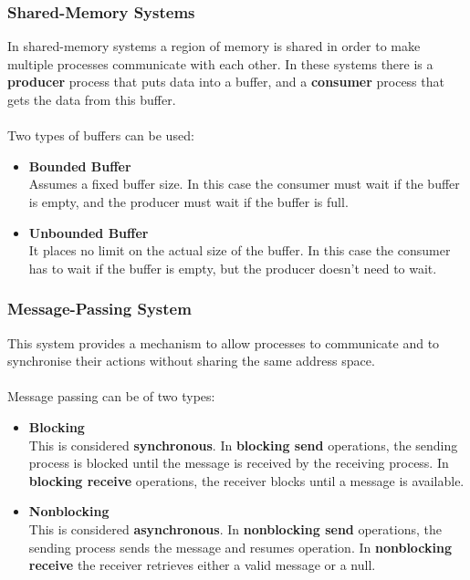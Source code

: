 \documentclass{article}
\begin{document}
\subsubsection{Shared-Memory Systems}
In shared-memory systems a region of memory is shared in order to make multiple processes communicate with each other. In these systems there is a \textbf{producer} process that puts data into a buffer, and a \textbf{consumer} process that gets the data from this buffer. \\ \\
Two types of buffers can be used:

\begin{itemize}
	\item \textbf{Bounded Buffer}
	\vspace{.2cm} \\
	Assumes a fixed buffer size. In this case the consumer must wait if the buffer is empty, and the producer must wait if the buffer is full.
	
	\item \textbf{Unbounded Buffer}
	\vspace{.2cm} \\
	It places no limit on the actual size of the buffer. In this case the consumer has to wait if the buffer is empty, but the producer doesn't need to wait.
\end{itemize}

\subsubsection{Message-Passing System}
This system provides a mechanism to allow processes to communicate and to synchronise their actions without sharing the same address space. \\ \\
Message passing can be of two types:

\begin{itemize}
	\item \textbf{Blocking}
	\vspace{.2cm} \\
	This is considered \textbf{synchronous}. In \textbf{blocking send} operations, the sending process is blocked until the message is received by the receiving process. In \textbf{blocking receive} operations, the receiver blocks until a message is available.
	
	\item \textbf{Nonblocking}\
	\vspace{.2cm} \\
	This is considered \textbf{asynchronous}. In \textbf{nonblocking send} operations, the sending process sends the message and resumes operation. In \textbf{nonblocking receive} the receiver retrieves either a valid message or a null.
\end{itemize}
\end{document}
